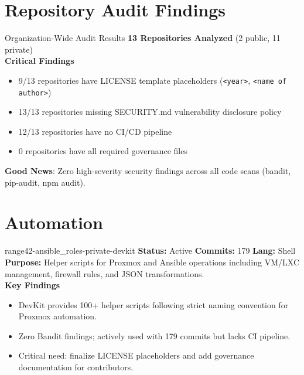 \documentclass[aspectratio=169]{beamer}
\begin{document}
\section{Repository Audit Findings}

\begin{frame}{Organization-Wide Audit Results \; \faClipboardCheck}
  \textbf{13 Repositories Analyzed} (2 public, 11 private)\\[3mm]
  
  \textbf{Critical Findings}
  \begin{itemize}
    \item \alert{9/13 repositories} have LICENSE template placeholders (\texttt{<year>}, \texttt{<name of author>})
    \item \alert{13/13 repositories} missing SECURITY.md vulnerability disclosure policy
    \item \alert{12/13 repositories} have no CI/CD pipeline
    \item \alert{0 repositories} have all required governance files
  \end{itemize}
  \vspace{2mm}
  \begin{tcolorbox}
    \faCheckCircle\; \textbf{Good News}: Zero high-severity security findings across all code scans (bandit, pip-audit, npm audit).
  \end{tcolorbox}
\end{frame}

\section{Automation}

\begin{frame}{range42-ansible\_roles-private-devkit \; \faTerminal}
  \textbf{Status:} Active \hfill \textbf{Commits:} 179 \hfill \textbf{Lang:} Shell\\[2mm]
  \textbf{Purpose:} Helper scripts for Proxmox and Ansible operations including VM/LXC management, firewall rules, and JSON transformations.\\[2mm]
  \textbf{Key Findings}
  \begin{itemize}
    \item DevKit provides 100+ helper scripts following strict naming convention for Proxmox automation.
    \item Zero Bandit findings; actively used with 179 commits but lacks CI pipeline.
    \item Critical need: finalize LICENSE placeholders and add governance documentation for contributors.
  \end{itemize}
\end{frame}
\end{document}
